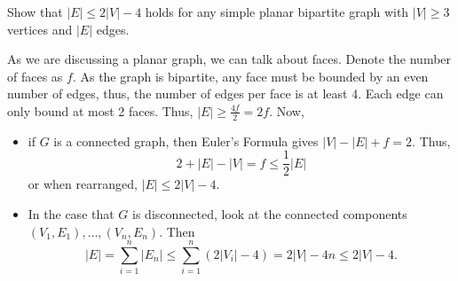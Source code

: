 \documentclass{article}
\begin{document}
\begin{exercise}\label{ex:planBipGraphs}
    Show that $|E|\leq 2|V| - 4$ holds for any simple planar bipartite graph with $|V|\geq 3$ vertices and $|E|$ edges.
\end{exercise}
\begin{solving}
    As we are discussing a planar graph, we can talk about faces. Denote the number of faces as $f$. As the graph is bipartite, any face must be bounded by an even number of edges, thus, the number of edges per face is at least 4. Each edge can only bound at most 2 faces. Thus, $|E|\geq \frac{4f}{2} = 2f$. Now,\begin{itemize}
        \item if $G$ is a connected graph, then Euler's Formula gives $|V|-|E| + f = 2$. Thus, \begin{equation*}
            2+  |E| -|V| = f \leq \frac12 |E|
        \end{equation*}
        or when rearranged, $|E|\leq 2|V|-4$.
        \item In the case that $G$ is disconnected, look at the connected components $(V_1,E_1), \dots, (V_n, E_n)$. Then \begin{equation*}
            |E| = \sum_{i=1}^n |E_n| \leq \sum_{i=1}^n\left( 2|V_i| - 4\right) = 2|V|-4n \leq 2|V|-4.
        \end{equation*}
    \end{itemize}
\end{solving}
\newpage
\end{document}
